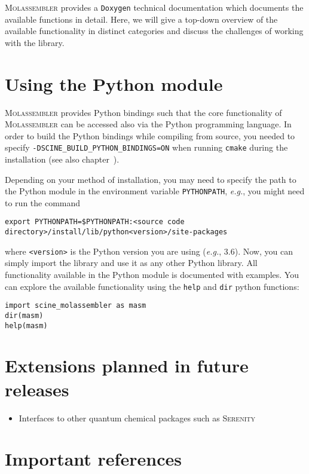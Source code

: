 \documentclass[]{tufte-book}
\begin{document}
\textsc{Molassembler} provides a \texttt{Doxygen} technical documentation which
documents the available functions in detail. Here, we will give a top-down
overview of the available functionality in distinct categories and discuss the
challenges of working with the library.

\newpage
\chapter{Using the Python module}

\textsc{Molassembler} provides Python bindings such that the core functionality
of \textsc{Molassembler} can be accessed also via the Python programming
language. In order to build the Python bindings while compiling from source, you
needed to specify \texttt{-DSCINE\_BUILD\_PYTHON\_BINDINGS=ON} when running
\texttt{cmake} during the installation (see also
chapter~).

Depending on your method of installation, you may need to specify the path to
the Python module in the environment variable \texttt{PYTHONPATH},
\textit{e.g.}, you might need to run the command 

\begin{Verbatim} 
export PYTHONPATH=$PYTHONPATH:<source code directory>/install/lib/python<version>/site-packages 
\end{Verbatim} 

where \texttt{<version>} is the Python version you are using (\textit{e.g.},
3.6). Now, you can simply import the library and use it as any other Python
library. All functionality available in the Python module is documented with
examples. You can explore the available functionality using the \texttt{help}
and \texttt{dir} python functions:

\begin{Verbatim}
import scine_molassembler as masm
dir(masm)
help(masm)
\end{Verbatim}

\chapter{Extensions planned in future releases}
\begin{itemize}
\item Interfaces to other quantum chemical packages such as \textsc{Serenity}\cite{serenity}
\end{itemize}


\chapter{Important references}
\end{document}
